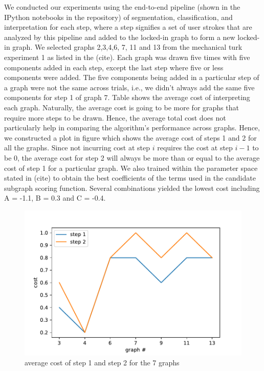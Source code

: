 We conducted our experiments using the end-to-end pipeline (shown in the IPython notebooks in the repository) of segmentation, classification, and interpretation for each step, where a step signifies a set of user strokes that are analyzed by this pipeline and added to the locked-in graph to form a new locked-in graph. We selected graphs 2,3,4,6, 7, 11 and 13 from the mechanical turk experiment 1 as listed in the (cite). Each graph was drawn five times with five components added in each step, except the last step where five or less components were added. The five components being added in a particular step of a graph were not the same across trials, i.e., we didn't always add the same five components for step 1 of graph 7. Table shows the average cost of interpreting each graph. Naturally, the average cost is going to be more for graphs that require more steps to be drawn. Hence, the average total cost does not particularly help in comparing the algorithm's performance across graphs. Hence, we constructed a plot in figure which shows the average cost of steps 1 and 2 for all the graphs. Since not incurring cost at step $i$ requires the cost at step $i-1$ to be 0, the average cost for step 2 will always be more than or equal to the average cost of step 1 for a particular graph. We also trained within the parameter space stated in (cite) to obtain the best coefficients of the terms used in the candidate subgraph scoring function. Several combinations yielded the lowest cost including A = -1.1, B = 0.3 and C = -0.4.

\begin{figure}[!htb]
    \centering
    \includegraphics[width=1.0\textwidth]{./img/cost_plot.pdf}
    \caption{average cost of step 1 and step 2 for the 7 graphs}
    \label{fig:cost_plot}
\end{figure}

